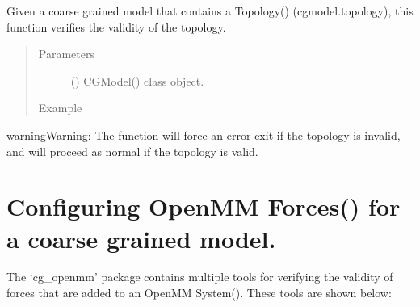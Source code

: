 \documentclass[letterpaper,12pt,english,openany,oneside]{sphinxmanual}
\begin{document}
\begin{fulllineitems}
\label{\detokenize{build:build.cg_build.verify_topology}}
Given a coarse grained model that contains a Topology() (cgmodel.topology), this function verifies the validity of the topology.
\begin{quote}\begin{description}
\item[{Parameters}] \leavevmode
{} () \textendash{} CGModel() class object.

\item[{Example}] \leavevmode
\end{description}\end{quote}

\begin{sphinxVerbatim}[commandchars=\\\{\}]
   
  
\end{sphinxVerbatim}

\begin{sphinxadmonition}{warning}{Warning:}
The function will force an error exit if the topology is invalid, and will proceed as normal if the topology is valid.
\end{sphinxadmonition}

\end{fulllineitems}


\newpage


\section{Configuring OpenMM Forces() for a coarse grained model.}
\label{\detokenize{build:configuring-openmm-forces-for-a-coarse-grained-model}}
The ‘cg\_openmm’ package contains multiple tools for verifying the validity of forces that are added to an OpenMM System().  These tools are shown below:

\label{\detokenize{build:module-build.cg_build}}
\end{document}
